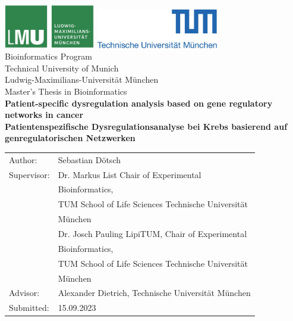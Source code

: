 \documentclass[pdftex,12pt,a4paper]{report}
\begin{document}
\begin{titlepage}
{\sffamily


\begin{center}
\includegraphics[width=0.3\textwidth]{bilder/logo2.jpg}
\hfill
\includegraphics[width=0.4\textwidth]{bilder/logo1.jpg}  
\\[3cm]  

{\Large Bioinformatics Program}\\[0.5cm]
{\Large Technical University of Munich}\\[0.5cm]
{\Large Ludwig-Maximilians-Universit\"at M\"unchen}\\[2cm]
{\Large Master's Thesis in Bioinformatics}\\[2cm]
{\textbf{\LARGE Patient-specific dysregulation analysis based on gene regulatory networks in cancer}}\\[2cm]
{\textbf{\LARGE Patientenspezifische Dysregulationsanalyse bei Krebs basierend auf genregulatorischen Netzwerken}}\\[3cm]

\end{center}
\begin{center}\Large
  \begin{tabular}{ll}
    Author:& Sebastian Dötsch\\
    Supervisor: &  Dr. Markus List Chair of Experimental \\
    & Bioinformatics,\\
    & TUM School of Life Sciences Technische Universität\\
    & München \\
    & Dr. Josch Pauling LipiTUM, Chair of Experimental \\
    & Bioinformatics, \\
    & TUM School of Life Sciences Technische Universität \\
    & München\\
    Advisor:        &  Alexander Dietrich, Technische Universität München\\
    Submitted:     &  15.09.2023
  \end{tabular}
\end{center}

}%

\end{titlepage}
\end{document}
